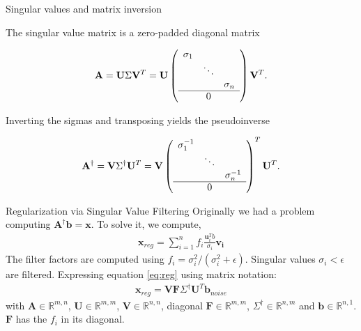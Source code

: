 \documentclass[notes]{beamer}
\begin{document}
  \begin{frame}{Singular values and matrix inversion \cite{golub1965calculating}}

    The singular value matrix is a zero-padded diagonal matrix

    \begin{align}
      \mathbf{A} = \mathbf{U} \Sigma \mathbf{V}^T = \mathbf{U}
        \left( 
        \begin{array}{c c c}
        \sigma_1 &        &           \\
                 & \ddots &            \\
                 &        &  \sigma_n \\ \hline 
                 &    0   &             \\
        \end{array}
        \right)
      \mathbf{V}^T .
    \end{align}

    Inverting the sigmas and transposing yields the pseudoinverse

    \begin{align}
      \mathbf{A}^{\dagger} = \mathbf{V} \Sigma^\dagger \mathbf{U}^T =
      \mathbf{V}
      \left( 
      \begin{array}{c c c}
        \sigma_1^{-1} &        &           \\
                 & \ddots &                 \\
                 &        &  \sigma_n^{-1} \\ \hline 
                 &    0   &                  \\
      \end{array}
      \right)^T
      \mathbf{U}^T .
    \end{align}
  \end{frame}

  \begin{frame}{Regularization via Singular Value Filtering}
  Originally we had a problem computing $\mathbf{A}^{\dagger}\mathbf{b} = \mathbf{x}$.
  To solve it, we compute,
  \begin{align} \label{eq:reg}
      \mathbf{x}_{reg} = \sum_{i=1}^{n} f_i \frac{\mathbf{u}_i^T b}{\sigma_i}\mathbf{v_i}
  \end{align}
  The filter factors are computed using $f_i = \sigma_i^2 / (\sigma_i^2 + \epsilon)$.
  Singular values $\sigma_i < \epsilon$ are filtered.
  Expressing equation \ref{eq:reg} using matrix notation:
  \begin{align}
    \mathbf{x}_{reg}= \mathbf{V} \mathbf{F} \Sigma^{\dagger}
    \mathbf{U}^T \mathbf{b}_{noise}
  \end{align}
  with $\mathbf{A} \in \mathbb{R}^{m,n}$, $\mathbf{U} \in \mathbb{R}^{m,m}$, $\mathbf{V} \in \mathbb{R}^{n,n}$, diagonal $\mathbf{F} \in \mathbb{R}^{m,m}$, $\Sigma^{\dagger} \in \mathbb{R}^{n,m}$
  and $\mathbf{b} \in \mathbb{R}^{n,1}$. $\mathbf{F}$ has the $f_i$ in its diagonal.
  \end{frame}
\end{document}
